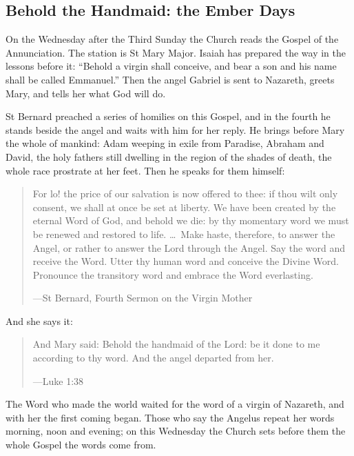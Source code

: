 \subsection{Behold the Handmaid: the Ember Days}\label{sec:ember}

On the Wednesday after the Third Sunday the Church reads the Gospel of the
Annunciation. The station is St Mary Major. Isaiah has prepared the way in the
lessons before it: ``Behold a virgin shall conceive, and bear a son and his name
shall be called Emmanuel.'' Then the angel Gabriel is sent to Nazareth, greets
Mary, and tells her what God will do.

St Bernard preached a series of homilies on this Gospel, and in the fourth he
stands beside the angel and waits with him for her reply. He brings before Mary
the whole of mankind: Adam weeping in exile from Paradise, Abraham and David,
the holy fathers still dwelling in the region of the shades of death, the whole
race prostrate at her feet. Then he speaks for them himself:

\begin{quote}
For lo! the price of our salvation is now offered to thee: if thou wilt only
consent, we shall at once be set at liberty. We have been created by the
eternal Word of God, and behold we die: by thy momentary word we must be renewed
and restored to life. \dots\ Make haste, therefore, to answer the Angel, or
rather to answer the Lord through the Angel. Say the word and receive the Word.
Utter thy human word and conceive the Divine Word. Pronounce the transitory word
and embrace the Word everlasting.\par
{\smallskip\noindent\small ---St Bernard, Fourth Sermon on the Virgin Mother\par}
\end{quote}

And she says it:

\begin{quote}
And Mary said: Behold the handmaid of the Lord: be it done to me according to
thy word. And the angel departed from her.\par
{\smallskip\noindent\small ---Luke 1:38\par}
\end{quote}

The Word who made the world waited for the word of a virgin of Nazareth, and
with her  the first coming began. Those who say the Angelus repeat
her words morning, noon and evening; on this Wednesday the Church sets before
them the whole Gospel the words come from.

